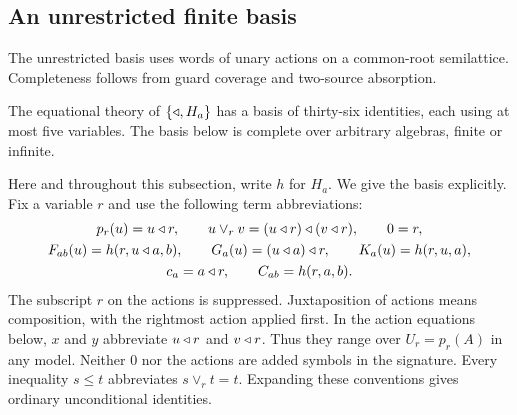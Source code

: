 \subsection{An unrestricted finite basis}\label{app:owner-finite-basis}

The unrestricted basis uses words of unary actions on a common-root
semilattice. Completeness follows from guard coverage and two-source
absorption.

\begin{theorem}\label{owner:thm:finite-basis}
The equational theory of $\{\mathbin{\triangleleft},H_a\}$ has a basis of thirty-six
identities, each using at most five variables. The basis below is
complete over arbitrary algebras, finite or infinite.
\end{theorem}

Here and throughout this subsection, write $h$ for $H_a$.
We give the basis explicitly. Fix a variable $r$ and use
the following term abbreviations:
\begin{gather*}
 p_r(u)=u\mathbin{\triangleleft} r,\qquad
 u\vee_r v=(u\mathbin{\triangleleft} r)\mathbin{\triangleleft}(v\mathbin{\triangleleft} r),\qquad 0=r,\\
 F_{ab}(u)=h(r,u\mathbin{\triangleleft} a,b),\qquad
 G_a(u)=(u\mathbin{\triangleleft} a)\mathbin{\triangleleft} r,\qquad K_a(u)=h(r,u,a),\\
 c_a=a\mathbin{\triangleleft} r,\qquad C_{ab}=h(r,a,b).
\end{gather*}
The subscript $r$ on the actions is suppressed. Juxtaposition of
actions means composition, with the rightmost action applied first.
In the action equations below, $x$ and $y$ abbreviate $u\mathbin{\triangleleft} r$
and $v\mathbin{\triangleleft} r$. Thus they range over $U_r=p_r(A)$ in any model.
Neither $0$ nor the actions are added symbols in the signature.
Every inequality $s\leq t$ abbreviates $s\vee_r t=t$.
Expanding these conventions gives ordinary unconditional identities.

